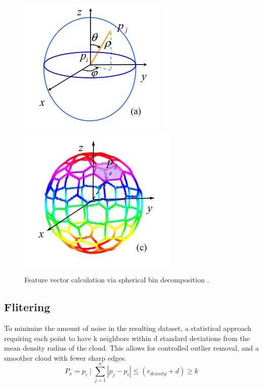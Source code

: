 \documentclass[12pt]{drexelthesis}
\let\Oldsubsection\subsection
\renewcommand{\subsection}{\FloatBarrier\Oldsubsection}
\begin{document}
\begin{figure}[!h]
\centering
\includegraphics{ISSfeaturevector2.jpg}  \includegraphics{ISSfeaturevector.jpg}
\caption[Intrinsic Shape Signature feature vectors]{\centering Feature vector calculation via spherical bin decomposition \cite{RN60}.}
\end{figure}

\subsection{Flitering}
To minimize the amount of noise in the resulting dataset, a statistical approach requiring each point to have k neighbors within d standard deviations from the mean density radius of the cloud. This allows for controlled outlier removal, and a smoother cloud with fewer sharp edges.
\begin{equation}
	P_{x} = p_{i} \mid \sum_{j=1}^n |p_{j} - p_{i}| \leq (r_{density} + d) \geq k
\end{equation}
\end{document}
